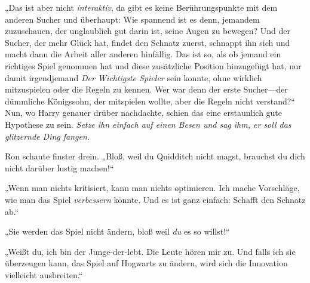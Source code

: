 „Das ist aber nicht \emph{interaktiv}, da gibt es keine Berührungspunkte mit dem anderen Sucher und überhaupt: Wie spannend ist es denn, jemandem zuzuschauen, der unglaublich gut darin ist, seine Augen zu bewegen? Und der Sucher, der mehr Glück hat, findet den Schnatz zuerst, schnappt ihn sich und macht dann die Arbeit aller anderen hinfällig. Das ist so, als ob jemand ein richtiges Spiel genommen hat und diese zusätzliche Position hinzugefügt hat, nur damit irgendjemand \emph{Der Wichtigste Spieler} sein konnte, ohne wirklich mitzuspielen oder die Regeln zu kennen. Wer war denn der erste Sucher—der dümmliche Königssohn, der mitspielen wollte, aber die Regeln nicht verstand?“
Nun, wo Harry genauer drüber nachdachte, schien das eine erstaunlich gute Hypothese zu sein. \emph{Setze ihn einfach auf einen Besen und sag ihm, er soll das glitzernde Ding fangen.}

Ron schaute finster drein. „Bloß, weil du Quidditch nicht magst, brauchst du dich nicht darüber lustig machen!“

„Wenn man nichts kritisiert, kann man nichts optimieren. Ich mache Vorschläge, wie man das Spiel \emph{verbessern} könnte. Und es ist ganz einfach: Schafft den Schnatz ab.“

„Sie werden das Spiel nicht ändern, bloß weil \emph{du} es so willst!“

„Weißt du, ich bin der Junge-der-lebt. Die Leute hören mir zu. Und falls ich sie überzeugen kann, das Spiel auf Hogwarts zu ändern, wird sich die Innovation vielleicht ausbreiten.“

